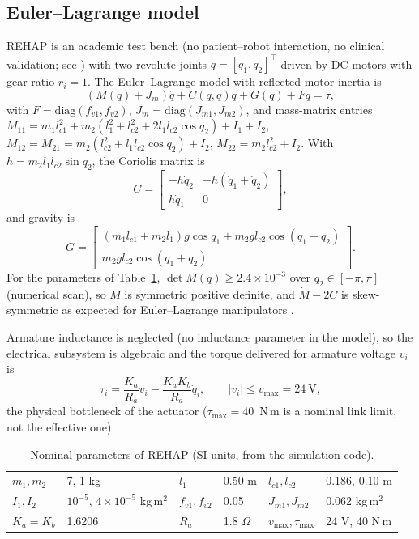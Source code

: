 \documentclass[10pt,journal,compsoc]{IEEEtran}
\newcommand{\rehap}{REHAP}
\begin{document}
\subsection{Euler--Lagrange model}
\rehap{} is an academic test bench (no patient--robot interaction, no clinical validation; see \cite{cervantes2025tesis,cervantes2025congreso}) with two revolute joints $q=[q_1,q_2]^\top$ driven by DC motors with gear ratio $r_i=1$. The Euler--Lagrange model with reflected motor inertia is
\begin{equation}
(M(q)+J_m)\ddot q + C(q,\dot q)\dot q + G(q) + F\dot q = \tau,
\label{eq:dyn}
\end{equation}
with $F=\mathrm{diag}(f_{v1},f_{v2})$, $J_m=\mathrm{diag}(J_{m1},J_{m2})$, and mass-matrix entries $M_{11}=m_1l_{c1}^2+m_2(l_1^2+l_{c2}^2+2l_1l_{c2}\cos q_2)+I_1+I_2$, $M_{12}=M_{21}=m_2(l_{c2}^2+l_1l_{c2}\cos q_2)+I_2$, $M_{22}=m_2l_{c2}^2+I_2$. With $h=m_2l_1l_{c2}\sin q_2$, the Coriolis matrix is
\begin{equation}
C=\begin{bmatrix}-h\dot q_2 & -h(\dot q_1+\dot q_2)\\ h\dot q_1 & 0\end{bmatrix},
\label{eq:coriolis}
\end{equation}
and gravity is
\begin{equation}
G=\begin{bmatrix}(m_1l_{c1}+m_2l_1)g\cos q_1+m_2gl_{c2}\cos(q_1+q_2)\\ m_2gl_{c2}\cos(q_1+q_2)\end{bmatrix}.
\label{eq:gravity}
\end{equation}
For the parameters of Table~\ref{tab:params}, $\det M(q)\ge2.4\times10^{-3}$ over $q_2\in[-\pi,\pi]$ (numerical scan), so $M$ is symmetric positive definite, and $\dot M-2C$ is skew-symmetric as expected for Euler--Lagrange manipulators \cite{spong2006}.

Armature inductance is neglected (no inductance parameter in the model), so the electrical subsystem is algebraic and the torque delivered for armature voltage $v_i$ is
\begin{equation}
\tau_i=\frac{K_a}{R_a}v_i-\frac{K_aK_b}{R_a}\dot q_i,\qquad |v_i|\le v_{\max}=24~\mathrm{V},
\label{eq:motor}
\end{equation}
the physical bottleneck of the actuator ($\tau_{\max}=40$~N\,m is a nominal link limit, not the effective one).

\begin{table}[t]
\centering\small
\caption{Nominal parameters of \rehap{} (SI units, from the simulation code).}
\label{tab:params}
\begin{tabular}{llllll}
\toprule
$m_1,m_2$ & 7, 1 kg & $l_1$ & 0.50 m & $l_{c1},l_{c2}$ & 0.186, 0.10 m\\
$I_1,I_2$ & $10^{-5}$, $4{\times}10^{-5}$ kg\,m$^2$ & $f_{v1},f_{v2}$ & 0.05 & $J_{m1},J_{m2}$ & 0.062 kg\,m$^2$\\
$K_a=K_b$ & 1.6206 & $R_a$ & 1.8 $\Omega$ & $v_{\max},\tau_{\max}$ & 24 V, 40 N\,m\\
\bottomrule
\end{tabular}
\end{table}
\end{document}
